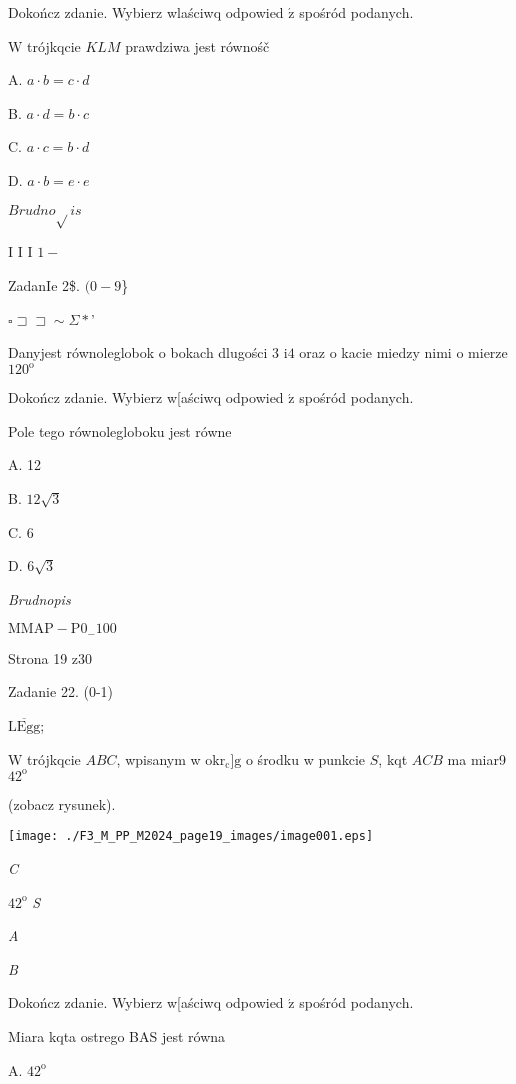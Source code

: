 \documentclass[a4paper,12pt]{article}
\begin{document}
Dokończ zdanie. Wybierz wlaściwq odpowied $\acute{\mathrm{z}}$ spośród podanych.

$\mathrm{W}$ trójkqcie $KLM$ prawdziwa jest równośč

A. $a\cdot b=c\cdot d$

B. $a\cdot d=b\cdot c$

C. $a\cdot c=b\cdot d$

D. $a\cdot b=e\cdot e$

$Brudno\sqrt{}is$

I I I $1 -$

ZadanIe 2{\$}. $(0-9$\}

$\square \sqsupset\sqsupset\sim\Sigma*$'

Danyjest równoleglobok o bokach dlugości 3 $\mathrm{i} 4$ oraz o kacie miedzy nimi o mierze $120^{\mathrm{o}}$

Dokończ zdanie. Wybierz w[aściwq odpowied $\acute{\mathrm{z}}$ spośród podanych.

Pole tego równolegloboku jest równe

A. 12

B. $12\sqrt{3}$

C. 6

D. $6\sqrt{3}$

{\it Brudnopis}

$\mathrm{M}\mathrm{M}\mathrm{A}\mathrm{P}-\mathrm{P}0_{-}100$

Strona 19 z30





Zadanie 22. (0-1)

$\overline{\mathrm{L}\mathrm{E}\mathrm{g}\mathrm{g}}$;

$\mathrm{W}$ trójkqcie $ABC$, wpisanym w $\mathrm{o}\mathrm{k}\mathrm{r}_{\mathrm{c}}$]$\mathrm{g}$ o środku w punkcie $S$, kqt $ACB$ ma miar9 $42^{\mathrm{o}}$

(zobacz rysunek).
\begin{center}
\texttt{[image: ./F3\_M\_PP\_M2024\_page19\_images/image001.eps]}
\end{center}
{\it C}

$42^{\mathrm{o}}$  {\it S}

{\it A}

{\it B}

Dokończ zdanie. Wybierz w[aściwq odpowied $\acute{\mathrm{z}}$ spośród podanych.

Miara kqta ostrego BAS jest równa

A. $42^{\mathrm{o}}$
\end{document}
